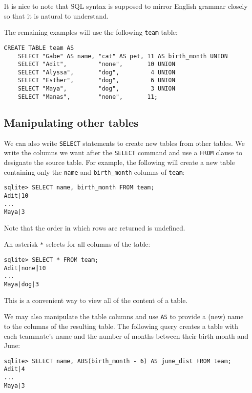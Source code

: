 \begin{meta}
It is nice to note that SQL syntax is supposed to mirror English grammar closely so that it is natural to understand. 
\end{meta}

The remaining examples will use the following \lstinline{team} table: 

\begin{blocksection}
\begin{lstlisting}
CREATE TABLE team AS 
    SELECT "Gabe" AS name, "cat" AS pet, 11 AS birth_month UNION
    SELECT "Adit",         "none",       10 UNION
    SELECT "Alyssa",       "dog",         4 UNION
    SELECT "Esther",       "dog",         6 UNION
    SELECT "Maya",         "dog",         3 UNION
    SELECT "Manas",        "none",       11;
\end{lstlisting}
\end{blocksection}

\subsection{Manipulating other tables}
We can also write \lstinline{SELECT} statements to create new tables from other tables. We write the columns we want after the \lstinline{SELECT} command and use a \lstinline{FROM} clause to designate the source table. For example, the following will create a new table containing only the \lstinline{name} and \lstinline{birth_month} columns of \lstinline{team}: 
\begin{lstlisting}
sqlite> SELECT name, birth_month FROM team; 
Adit|10
...
Maya|3
\end{lstlisting}

Note that the order in which rows are returned is undefined. 

An asterisk \lstinline{*} selects for all columns of the table: 
\begin{lstlisting}
sqlite> SELECT * FROM team; 
Adit|none|10
...
Maya|dog|3
\end{lstlisting}

This is a convenient way to view all of the content of a table. 

We may also manipulate the table columns and use \lstinline{AS} to provide a (new) name to the columns of the resulting table. The following query creates a table with each teammate's name and the number of months between their birth month and June: 
\begin{lstlisting}
sqlite> SELECT name, ABS(birth_month - 6) AS june_dist FROM team; 
Adit|4
...
Maya|3
\end{lstlisting}

